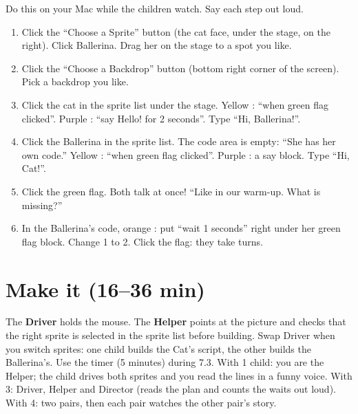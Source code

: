\begin{workedexample}
Do this on your Mac while the children watch. Say each step out loud.
\begin{enumerate}[leftmargin=1.4em,itemsep=1pt]
  \item Click the \enquote{Choose a Sprite} button (the cat face, under the stage, on the right). Click Ballerina. Drag her on the stage to a spot you like.
  \item Click the \enquote{Choose a Backdrop} button (bottom right corner of the screen). Pick a backdrop you like.
  \item Click the cat in the sprite list under the stage. Yellow : \enquote{when green flag clicked}. Purple : \enquote{say Hello! for 2 seconds}. Type \enquote{Hi, Ballerina!}.
  \item Click the Ballerina in the sprite list. The code area is empty: \enquote{She has her own code.} Yellow : \enquote{when green flag clicked}. Purple : a say block. Type \enquote{Hi, Cat!}.
  \item Click the green flag. Both talk at once! \enquote{Like in our warm-up. What is missing?}
  \item In the Ballerina's code, orange : put \enquote{wait 1 seconds} right under her green flag block. Change 1 to 2. Click the flag: they take turns.
\end{enumerate}
\begin{center}
\begin{scratch}[scale=0.85]
\end{scratch}
\qquad
\begin{scratch}[scale=0.85]
\end{scratch}
\end{center}
\end{workedexample}

\section{Make it (16--36 min)}
\begin{pairroles}
The \textbf{Driver} holds the mouse. The \textbf{Helper} points at the picture and checks that the right sprite is selected in the sprite list before building. Swap Driver when you switch sprites: one child builds the Cat's script, the other builds the Ballerina's. Use the timer (5 minutes) during 7.3. With 1 child: you are the Helper; the child drives both sprites and you read the lines in a funny voice. With 3: Driver, Helper and Director (reads the plan and counts the waits out loud). With 4: two pairs, then each pair watches the other pair's story.
\end{pairroles}

